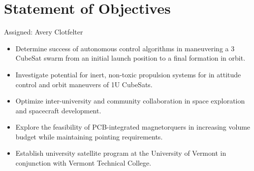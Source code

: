 \section{Statement of Objectives}
Assigned: Avery Clotfelter

\begin{itemize}
  \item Determine success of autonomous control algorithms in
    maneuvering a 3 CubeSat swarm from an initial launch position to a
    final formation in orbit.
  \item Investigate potential for inert, non-toxic propulsion systems
    for in attitude control and orbit maneuvers of 1U CubeSats.
  \item Optimize inter-university and community collaboration in space
    exploration and spacecraft development.
  \item Explore the feasibility of PCB-integrated magnetorquers in
    increasing volume budget while maintaining pointing requirements.
  \item Establish university satellite program at the University of
    Vermont in conjunction with Vermont Technical College.
\end{itemize}
